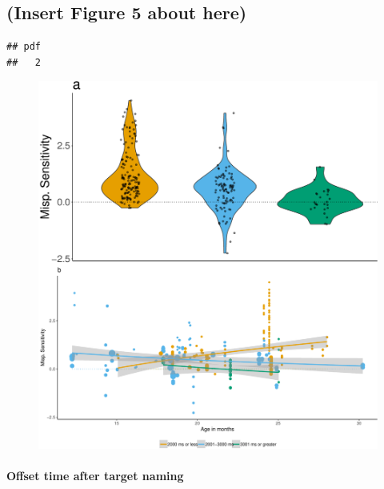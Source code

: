 \documentclass[man]{apa6}
\let\oldparagraph\paragraph
\renewcommand{\paragraph}[1]{\oldparagraph{#1}\mbox{}}
\theoremstyle{definition}
\theoremstyle{definition}
\theoremstyle{definition}
\theoremstyle{remark}
\begin{document}
\subsection{(Insert Figure 5 about
here)}\label{insert-figure-5-about-here}

\begin{verbatim}
## pdf 
##   2
\end{verbatim}

\begin{figure}
\centering
\includegraphics{Paper_Analyses_files/figure-latex/Plot_post_name_cond_age-1.pdf}
\caption{}
\end{figure}

\paragraph{Offset time after target
naming}\label{offset-time-after-target-naming}
\end{document}
